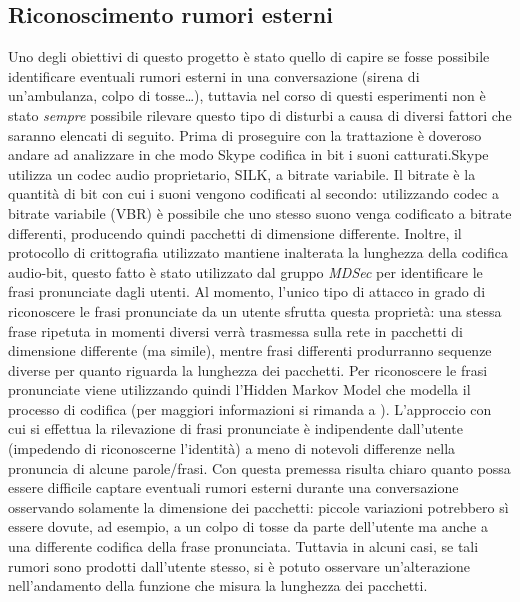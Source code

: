 \subsection{Riconoscimento rumori esterni}

Uno degli obiettivi di questo progetto è stato quello di capire se fosse possibile identificare eventuali rumori esterni in una conversazione (sirena di un'ambulanza, colpo di tosse\dots), tuttavia nel corso di questi esperimenti non è stato \emph{sempre} possibile rilevare questo tipo di disturbi a causa di diversi fattori che saranno elencati di seguito.\newline
Prima di proseguire con la trattazione è doveroso andare ad analizzare in che modo Skype codifica in bit i suoni catturati.\newline\newline Skype utilizza un codec audio proprietario, SILK, a bitrate variabile. Il bitrate è la quantità di bit con cui i suoni vengono codificati al secondo: utilizzando codec a bitrate variabile (VBR) è possibile che uno stesso suono venga codificato a bitrate differenti, producendo quindi pacchetti di dimensione differente. Inoltre, il protocollo di crittografia utilizzato mantiene inalterata la lunghezza della codifica audio-bit, questo fatto è stato utilizzato dal gruppo \emph{MDSec} per identificare le frasi pronunciate dagli utenti.\newline\newline
Al momento, l'unico tipo di attacco  in grado di riconoscere le frasi pronunciate da un utente sfrutta questa proprietà: una stessa frase ripetuta in momenti diversi verrà trasmessa sulla rete in pacchetti di dimensione differente (ma simile), mentre frasi differenti produrranno sequenze diverse per quanto riguarda la lunghezza dei pacchetti. Per riconoscere le frasi pronunciate viene utilizzando quindi l'Hidden Markov Model che modella il processo di codifica (per maggiori informazioni si rimanda a \cite{bibitem1}). L'approccio con cui si effettua la rilevazione di frasi pronunciate è indipendente dall'utente (impedendo di riconoscerne l'identità) a meno di notevoli differenze nella pronuncia di alcune parole/frasi.
\newline
Con questa premessa risulta chiaro quanto possa essere difficile captare eventuali rumori esterni durante una conversazione osservando solamente la dimensione dei pacchetti: piccole variazioni potrebbero sì essere dovute, ad esempio, a un colpo di tosse da parte dell'utente ma anche a una differente codifica della frase pronunciata. Tuttavia in alcuni casi, se tali rumori sono prodotti dall'utente stesso, si è potuto osservare un'alterazione nell'andamento della funzione che misura la lunghezza dei pacchetti.\newline\newline
